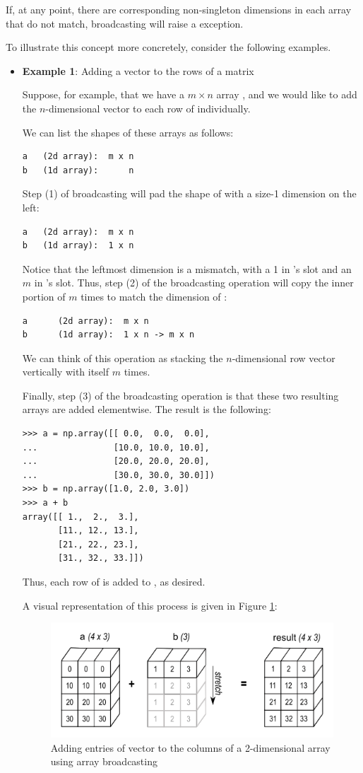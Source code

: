 If, at any point, there are corresponding non-singleton dimensions in each array that do not match, broadcasting will raise a  exception.

To illustrate this concept more concretely, consider the following examples.

\begin{itemize}
	\item \textbf{Example 1}: Adding a vector to the rows of a matrix

	Suppose, for example, that we have a $m \times n$ array , and we would like to add the $n$-dimensional vector  to each row of  individually.

	We can list the shapes of these arrays as follows:
\begin{lstlisting}
a	(2d array):  m x n
b	(1d array):      n
\end{lstlisting}
Step (1) of broadcasting will pad the shape of  with a size-1 dimension on the left:
\begin{lstlisting}
a	(2d array):  m x n
b	(1d array):  1 x n
\end{lstlisting}

Notice that the leftmost dimension is a mismatch, with a 1 in 's slot and an $m$ in 's slot.
Thus, step (2) of the broadcasting operation will copy the inner portion of  $m$ times to match the dimension of :
\begin{lstlisting}
a	   (2d array):  m x n
b	   (1d array):  1 x n -> m x n
\end{lstlisting}
We can think of this operation as stacking the $n$-dimensional row vector  vertically with itself $m$ times.

Finally, step (3) of the broadcasting operation is that these two resulting arrays are added elementwise.
The result is the following:
\begin{lstlisting}
>>> a = np.array([[ 0.0,  0.0,  0.0],
...               [10.0, 10.0, 10.0],
...               [20.0, 20.0, 20.0],
...               [30.0, 30.0, 30.0]])
>>> b = np.array([1.0, 2.0, 3.0])
>>> a + b
array([[ 1.,  2.,  3.],
       [11., 12., 13.],
       [21., 22., 23.],
       [31., 32., 33.]])
\end{lstlisting}
Thus, each row of  is added to , as desired.

A visual representation of this process is given in Figure \ref{fig:broadcasting2}:

\begin{figure}[H]
    \includegraphics[width=.7\textwidth]{figures/broadcasting_vector.png}
    \caption{Adding entries of vector to the columns of a 2-dimensional array using array broadcasting}
    \label{fig:broadcasting2}
\end{figure}



\end{itemize}

